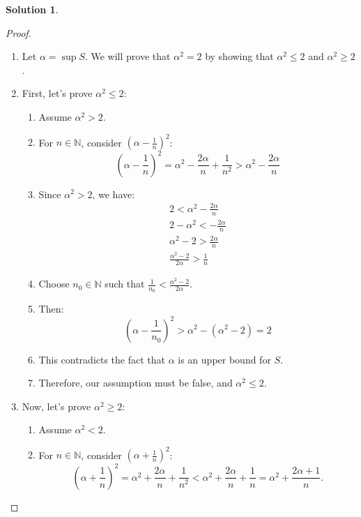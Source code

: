 \documentclass[12pt]{article}
\theoremstyle{definition} %
\newtheorem{solution}{Solution}
\theoremstyle{plain} %
\begin{document}
\begin{solution}
    \begin{proof}
        \begin{enumerate}
            \item Let $\alpha = \sup S$. We will prove that $\alpha^2 = 2$ by showing that $\alpha^2 \leq 2$ and $\alpha^2 \geq 2$.
            \item First, let's prove $\alpha^2 \leq 2$:
            \begin{enumerate}
                \item Assume $\alpha^2 > 2$.
                \item For $n \in \mathbb{N}$, consider $(\alpha - \frac{1}{n})^2$:
                $$
                \left( \alpha-\frac{1}{n} \right)^2=\alpha^2-\frac{2\alpha}{n}+\frac{1}{n^2}>\alpha^2-\frac{2\alpha}{n}
                $$
                \item Since $\alpha^2 > 2$, we have:
                \begin{align}
                2<\alpha^2-\frac{2\alpha}{n} \\
                2-\alpha^2<-\frac{2\alpha}{n} \\
                \alpha^2-2> \frac{2\alpha}{n} \\
                \frac{\alpha^2-2}{2\alpha}> \frac{1}{n}
                \end{align}
                \item Choose $n_0 \in \mathbb{N}$ such that $\frac{1}{n_0} < \frac{\alpha^2-2}{2\alpha}$.
                \item Then:
                $$
                \left( \alpha-\frac{1}{n_0} \right)^2>\alpha^2-(\alpha^2-2)=2
                $$
                \item This contradicts the fact that $\alpha$ is an upper bound for $S$.
                \item Therefore, our assumption must be false, and $\alpha^2 \leq 2$.
            \end{enumerate}
            \item Now, let's prove $\alpha^2 \geq 2$:
            \begin{enumerate}
                \item Assume $\alpha^2 < 2$.
                \item For $n \in \mathbb{N}$, consider $(\alpha + \frac{1}{n})^2$:
                $$
                \left( \alpha + \frac{1}{n} \right)^2 = \alpha^2 + \frac{2\alpha}{n} + \frac{1}{n^2} < \alpha^2 + \frac{2\alpha}{n} + \frac{1}{n} = \alpha^2 + \frac{2\alpha + 1}{n}.
$$
\end{enumerate}
\end{enumerate}
\end{proof}
\end{solution}
\end{document}
